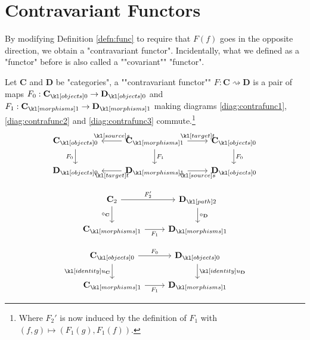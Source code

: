 \documentclass[main.tex]{subfiles}
\begin{document}
\section{Contravariant Functors}
By modifying Definition \ref{defn:func} to require that $F(f)$ goes in the opposite direction, we obtain a "contravariant functor". \AP Incidentally, what we defined as a "functor" before is also called a ""covariant"" "functor".
\begin{defn}\label{defn:contrafunc}
	\AP Let $\mathbf{C}$ and $\mathbf{D}$ be "categories", a ""contravariant functor"" $F: \mathbf{C} \rightsquigarrow \mathbf{D}$ is a pair of maps $F_0:\obj{\mathbf{C}} \rightarrow \obj{\mathbf{D}}$ and $F_1:\mor{\mathbf{C}} \rightarrow \mor{\mathbf{D}}$ making diagrams \eqref{diag:contrafunc1}, \eqref{diag:contrafunc2} and \eqref{diag:contrafunc3} commute.\footnote{Where $F_2'$ is now induced by the definition of $F_1$ with $(f,g) \mapsto (F_1(g), F_1(f))$.}
	\begin{equation}\label{diag:contrafunc1}
	\begin{tikzcd}
	\obj{\mathbf{C}} \arrow[d, "F_0"'] & \mor{\mathbf{C}} \arrow[d, "F_1"] \arrow[l, "\source"'] \arrow[r, "\target"] & \obj{\mathbf{C}} \arrow[d, "F_0"] \\
	\obj{\mathbf{D}} & \mor{\mathbf{D}} \arrow[l, "\target"] \arrow[r, "\source"'] & \obj{\mathbf{D}}
	\end{tikzcd}
	\end{equation}
	\begin{minipage}{0.49\textwidth}
		\begin{equation}\label{diag:contrafunc2}
		\begin{tikzcd}
		\mathbf{C}_2 \arrow[d, "\circ_{\mathbf{C}}"'] \arrow[r, "F_2'"] & \mortwo{\mathbf{D}} \arrow[d, "\circ_{\mathbf{D}}"] \\
		\mor{\mathbf{C}} \arrow[r, "F_1"'] & \mor{\mathbf{D}}
		\end{tikzcd}
		\end{equation}
	\end{minipage}
	\begin{minipage}{0.49\textwidth}
		\begin{equation}\label{diag:contrafunc3}
		\begin{tikzcd}
		\obj{\mathbf{C}} \arrow[d, "\idu_{\mathbf{C}}"'] \arrow[r, "F_0"] & \obj{\mathbf{D}} \arrow[d, "\idu_{\mathbf{D}}"] \\
		\mor{\mathbf{C}} \arrow[r, "F_1"'] & \mor{\mathbf{D}}
		\end{tikzcd}

\end{equation}
\end{minipage}
\end{defn}
\end{document}
